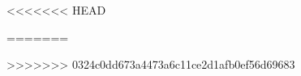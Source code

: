<<<<<<< HEAD
\usepackage[pages=some]{background}
=======

\usepackage[fontsize=9.5pt]{fontsize}
>>>>>>> 0324c0dd673a4473a6c11ce2d1afb0ef56d69683


\setlength{\itemsep}{1pt}
\setlength{\parskip}{0pt}
\setlength{\parsep}{0pt}
\setlength{\labelsep}{0pt}
\setlength{\topsep}{0pt}
\setlength{\parsep}{0pt}
\setlength{\partopsep}{0pt}